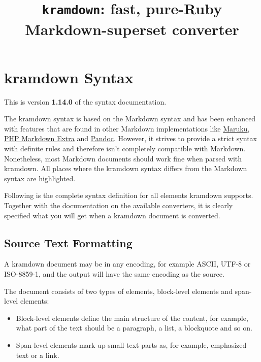 \documentclass[a4paper]{article}
\title{\texttt{kramdown}: fast, pure-Ruby Markdown-superset converter}
\begin{document}
\maketitle

\tableofcontents

\newpage

\hypertarget{content}{}
\hypertarget{kramdown-syntax}{\section{kramdown
Syntax}\label{kramdown-syntax}}

This is version \textbf{1.14.0} of the syntax documentation.

The kramdown syntax is based on the Markdown syntax and has been
enhanced with features that are found in other Markdown implementations
like \href{http://maruku.rubyforge.org}{Maruku},
\href{http://michelf.com/projects/php-markdown/extra/}{PHP Markdown
Extra} and \href{http://johnmacfarlane.net/pandoc/}{Pandoc}. However, it
strives to provide a strict syntax with definite rules and therefore
isn't completely compatible with Markdown. Nonetheless, most Markdown
documents should work fine when parsed with kramdown. All places where
the kramdown syntax differs from the Markdown syntax are highlighted.

Following is the complete syntax definition for all elements kramdown
supports. Together with the documentation on the available converters,
it is clearly specified what you will get when a kramdown document is
converted.

\hypertarget{source-text-formatting}{\subsection{Source Text
Formatting}\label{source-text-formatting}}

A kramdown document may be in any encoding, for example ASCII, UTF-8 or
ISO-8859-1, and the output will have the same encoding as the source.

The document consists of two types of elements, block-level elements and
span-level elements:

\begin{itemize}
\item
  Block-level elements define the main structure of the content, for
  example, what part of the text should be a paragraph, a list, a
  blockquote and so on.
\item
  Span-level elements mark up small text parts as, for example,
  emphasized text or a link.
\end{itemize}
\end{document}
